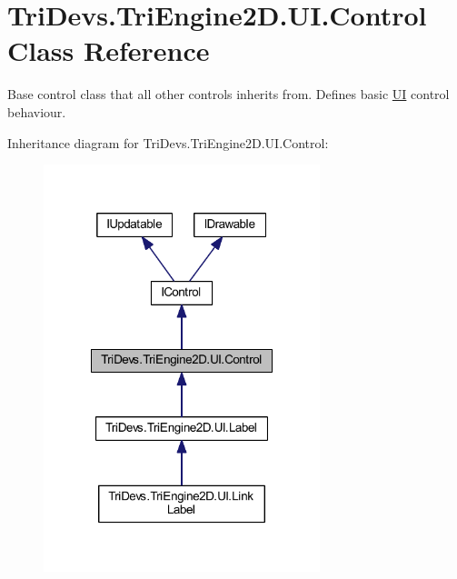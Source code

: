 \hypertarget{class_tri_devs_1_1_tri_engine2_d_1_1_u_i_1_1_control}{\section{Tri\-Devs.\-Tri\-Engine2\-D.\-U\-I.\-Control Class Reference}
\label{class_tri_devs_1_1_tri_engine2_d_1_1_u_i_1_1_control}
}


Base control class that all other controls inherits from. Defines basic \hyperlink{namespace_tri_devs_1_1_tri_engine2_d_1_1_u_i}{U\-I} control behaviour.  




Inheritance diagram for Tri\-Devs.\-Tri\-Engine2\-D.\-U\-I.\-Control\-:
\nopagebreak
\begin{figure}[H]
\begin{center}
\leavevmode
\includegraphics[width=228pt]{class_tri_devs_1_1_tri_engine2_d_1_1_u_i_1_1_control__inherit__graph}
\end{center}
\end{figure}


